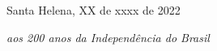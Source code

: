 \begin{flushright}
    Santa Helena, XX de xxxx de 2022\par
    \textit{aos 200 anos da Independência do Brasil}
\end{flushright}